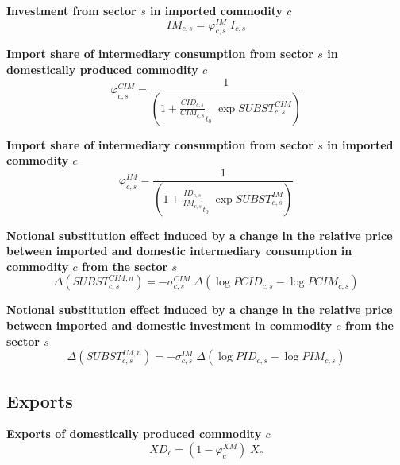 \documentclass[12pt]{article}
\numberwithin{equation}{section}
\begin{document}
\noindent \textbf{Investment from sector $s$ in imported commodity $c$} 
\begin{dmath}
IM_{c, s} = \varphi^{IM}_{c, s} \; I_{c, s}
\label{Trade_inter.mdlIM[c, s]}
\end{dmath}

\noindent \textbf{Import share of intermediary consumption from sector $s$ in domestically produced commodity $c$} 
\begin{dmath}
\varphi^{CIM}_{c, s} = \frac{1}{\left( 1 + \frac{CID_{c, s}}{CIM_{c, s}}_{t_0} \; \operatorname{exp} SUBST^{CIM}_{c, s} \right)}
\label{Trade_inter.mdlphi_CIM[c, s]}
\end{dmath}

\noindent \textbf{Import share of intermediary consumption from sector $s$ in imported commodity $c$} 
\begin{dmath}
\varphi^{IM}_{c, s} = \frac{1}{\left( 1 + \frac{ID_{c, s}}{IM_{c, s}}_{t_0} \; \operatorname{exp} SUBST^{IM}_{c, s} \right)}
\label{Trade_inter.mdlphi_IM[c, s]}
\end{dmath}

\noindent \textbf{Notional substitution effect induced by a change in the relative price between imported and domestic intermediary consumption in commodity $c$ from the sector $s$} 
\begin{dmath}
\varDelta \left(SUBST^{CIM,n}_{c, s}\right) = -\sigma^{CIM}_{c, s} \; \varDelta \left(\operatorname{log} PCID_{c, s} - \operatorname{log} PCIM_{c, s}\right)
\label{Trade_inter.mdlSUBST_CIM_n[c, s]}
\end{dmath}

\noindent \textbf{Notional substitution effect induced by a change in the relative price between imported and domestic investment in commodity $c$ from the sector $s$} 
\begin{dmath}
\varDelta \left(SUBST^{IM,n}_{c, s}\right) = -\sigma^{IM}_{c, s} \; \varDelta \left(\operatorname{log} PID_{c, s} - \operatorname{log} PIM_{c, s}\right)
\label{Trade_inter.mdlSUBST_IM_n[c, s]}
\end{dmath}





\subsection{Exports}


\noindent \textbf{Exports of domestically produced commodity $c$} 
\begin{dmath}
XD_{c} = \left( 1 - \varphi^{XM}_{c} \right) \; X_{c}
\label{Trade_inter.mdlXD[c]}
\end{dmath}
\end{document}
